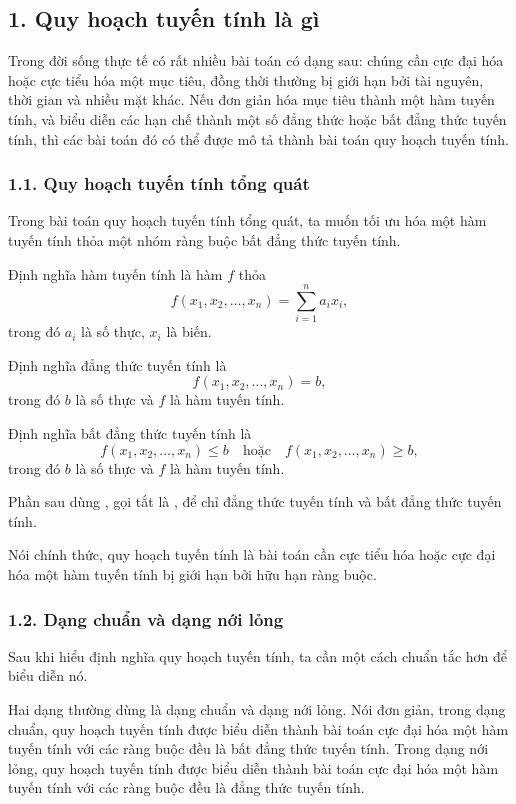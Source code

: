 \documentclass[11pt]{article}
\begin{document}
\subsection*{1. Quy hoạch tuyến tính là gì}

Trong đời sống thực tế có rất nhiều bài toán có dạng sau: chúng cần cực đại
hóa hoặc cực tiểu hóa một mục tiêu, đồng thời thường bị giới hạn bởi tài
nguyên, thời gian và nhiều mặt khác. Nếu đơn giản hóa mục tiêu thành một hàm
tuyến tính, và biểu diễn các hạn chế thành một số đẳng thức hoặc bất đẳng thức
tuyến tính, thì các bài toán đó có thể được mô tả thành bài toán quy hoạch
tuyến tính.

\subsubsection*{1.1. Quy hoạch tuyến tính tổng quát}

Trong bài toán quy hoạch tuyến tính tổng quát, ta muốn tối ưu hóa một hàm
tuyến tính thỏa một nhóm ràng buộc bất đẳng thức tuyến tính.

Định nghĩa hàm tuyến tính là hàm \(f\) thỏa
\[
  f(x_1,x_2,\ldots,x_n)=\sum_{i=1}^{n}a_ix_i,
\]
trong đó \(a_i\) là số thực, \(x_i\) là biến.

Định nghĩa đẳng thức tuyến tính là
\[
  f(x_1,x_2,\ldots,x_n)=b,
\]
trong đó \(b\) là số thực và \(f\) là hàm tuyến tính.

Định nghĩa bất đẳng thức tuyến tính là
\[
  f(x_1,x_2,\ldots,x_n)\le b
  \quad\text{hoặc}\quad
  f(x_1,x_2,\ldots,x_n)\ge b,
\]
trong đó \(b\) là số thực và \(f\) là hàm tuyến tính.

Phần sau dùng , gọi tắt là , để
chỉ đẳng thức tuyến tính và bất đẳng thức tuyến tính.

Nói chính thức, quy hoạch tuyến tính là bài toán cần cực tiểu hóa hoặc cực đại
hóa một hàm tuyến tính bị giới hạn bởi hữu hạn ràng buộc.

\subsubsection*{1.2. Dạng chuẩn và dạng nới lỏng}

Sau khi hiểu định nghĩa quy hoạch tuyến tính, ta cần một cách chuẩn tắc hơn để
biểu diễn nó.

Hai dạng thường dùng là dạng chuẩn và dạng nới lỏng. Nói đơn giản, trong dạng
chuẩn, quy hoạch tuyến tính được biểu diễn thành bài toán cực đại hóa một hàm
tuyến tính với các ràng buộc đều là bất đẳng thức tuyến tính. Trong dạng nới
lỏng, quy hoạch tuyến tính được biểu diễn thành bài toán cực đại hóa một hàm
tuyến tính với các ràng buộc đều là đẳng thức tuyến tính.
\end{document}

